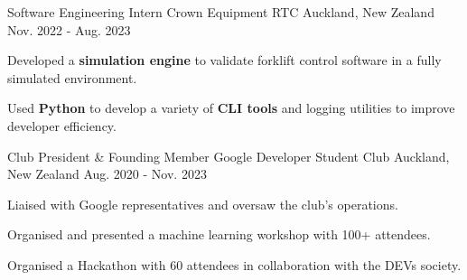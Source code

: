 \begin{cventries}
  \cventry
    {Software Engineering Intern}
    {Crown Equipment RTC}
    {Auckland, New Zealand}
    {Nov. 2022 - Aug. 2023}
    {
      \begin{cvitems}
        \item {Developed a \textbf{simulation engine} to validate forklift control software in a fully simulated environment.}
        \item {Used \textbf{Python} to develop a variety of \textbf{CLI tools} and logging utilities to improve developer efficiency.}
      \end{cvitems}
    }


  \cventry
    {Club President \& Founding Member} %
    {Google Developer Student Club} %
    {Auckland, New Zealand} %
    {Aug. 2020 - Nov. 2023} %
    {
      \begin{cvitems} %
        \item {Liaised with Google representatives and oversaw the club's operations.}
        \item {Organised and presented a machine learning workshop with 100+ attendees.}
        \item {Organised a Hackathon with 60 attendees in collaboration with the DEVs society.}
      \end{cvitems}
    }




\end{cventries}
